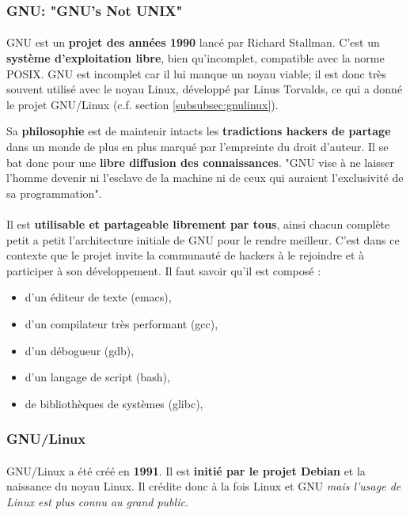 \subsubsection*{GNU: "GNU's Not UNIX"}\label{subsubsec:gnu}

\paragraph{} GNU est un \textbf{projet des années 1990} lancé par Richard
Stallman. C'est un \textbf{système d'exploitation libre}, bien qu'incomplet,
compatible avec la norme POSIX. GNU est incomplet car il lui manque un noyau
viable; il est donc très souvent utilisé avec le noyau Linux, développé par
Linus Torvalds, ce qui a donné le projet GNU/Linux (c.f. section
\ref{subsubsec:gnulinux}).

Sa \textbf{philosophie} est de maintenir intacts les \textbf{tradictions hackers
de partage} dans un monde de plus en plus marqué par l'empreinte du droit
d'auteur. Il se bat donc pour une \textbf{libre diffusion des connaissances}.
"GNU vise à ne laisser l'homme devenir ni l'esclave de la machine ni de ceux
qui auraient l'exclusivité de sa programmation".

\paragraph{} Il est \textbf{utilisable et partageable librement par tous},
ainsi chacun complète petit a petit l'architecture initiale de GNU pour le
rendre meilleur. C'est dans ce contexte que le projet invite la communauté de
hackers à le rejoindre et à participer à son développement. Il faut savoir
qu'il est composé :

\begin{itemize}
	\item d'un éditeur de texte (emacs),
	\item d'un compilateur très performant (gcc),
	\item d'un débogueur (gdb),
	\item d'un langage de script (bash),
	\item de bibliothèques de systèmes (glibc),
\end{itemize}

\subsubsection*{GNU/Linux}\label{subsubsec:gnulinux}

\paragraph{} GNU/Linux a été créé en \textbf{1991}. Il est \textbf{initié par
le projet Debian} et la naissance du noyau Linux. Il crédite donc à la fois
Linux et GNU \textit{mais l'usage de Linux est plus connu au grand public}.

